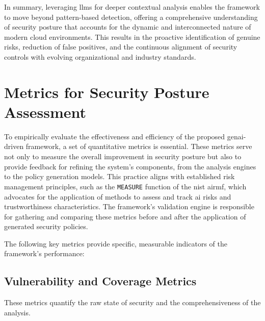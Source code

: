 In summary, leveraging \glspl{llm} for deeper contextual analysis enables the framework to move beyond pattern-based detection, offering a comprehensive understanding of security posture that accounts for the dynamic and interconnected nature of modern cloud environments\cite{li_iris_2025,andrade_enhancing_2025-1}. This results in the proactive identification of genuine risks, reduction of false positives, and the continuous alignment of security controls with evolving organizational and industry standards.


\section{Metrics for Security Posture Assessment} %
\label{sec:Metrics for Security Posture Assessment}

To empirically evaluate the effectiveness and efficiency of the proposed \gls{genai}-driven framework, a set of quantitative metrics is essential. These metrics serve not only to measure the overall improvement in security posture but also to provide feedback for refining the system's components, from the analysis engines to the policy generation models. This practice aligns with established risk management principles, such as the \texttt{MEASURE} function of the \gls{nist} \gls{airmf}, which advocates for the application of methods to assess and track \gls{ai} risks and trustworthiness characteristics. The framework's validation engine is responsible for gathering and comparing these metrics before and after the application of generated security policies.

The following key metrics provide specific, measurable indicators of the framework's performance:

\subsection*{Vulnerability and Coverage Metrics}
These metrics quantify the raw state of security and the comprehensiveness of the analysis.


